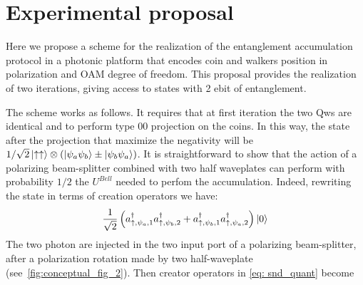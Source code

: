 \documentclass[
	aps, pra,
	superscriptaddress, twocolumn,
	floatfix,
	10pt
]{revtex4-1}
\begin{document}



\section{Experimental proposal}
\label{sec:experimental_proposal}
Here we propose a scheme for the realization of the entanglement accumulation protocol in a photonic platform that encodes coin and walkers position in polarization and OAM degree of freedom. This proposal provides the realization of two iterations, giving access to states with 2 ebit of entanglement. 

The scheme works as follows. It requires that at first iteration the two Qws are identical and to perform type 00 projection on the coins. In this way, the state after the projection that maximize the negativity will be $1/\sqrt{2}\ket{\uparrow \uparrow}\otimes(\ket{\psi_a\psi_b}\pm\ket{\psi_b\psi_a})$. 
It is straightforward to show that the action of a polarizing beam-splitter combined with two half waveplates can perform with probability $1/2$ the $U^{Bell}$ needed to perfom the accumulation.
Indeed, rewriting the state in terms of creation operators we have:
\begin{equation}
    \frac{1}{\sqrt{2}}\left(a^{\dagger}_{\uparrow, \psi_a,1}a^{\dagger}_{\uparrow, \psi_b,2}+a^{\dagger}_{\uparrow, \psi_b,1}a^{\dagger}_{\uparrow, \psi_a,2} \right)\ket{0} 
    \label{eq: snd_quant}
\end{equation}
The two photon are injected in the two input port of a polarizing beam-splitter, after a polarization rotation made by two half-waveplate (see~\cref{fig:conceptual_fig_2}). Then creator operators in \cref{eq: snd_quant} become
\end{document}
